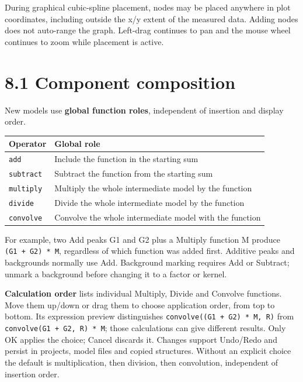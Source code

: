 \documentclass[
  10pt,
  a4paper,
  oneside]{scrreprt}
\begin{document}
During graphical cubic-spline placement, nodes may be placed anywhere in
plot coordinates, including outside the x/y extent of the measured data.
Adding nodes does not auto-range the graph. Left-drag continues to pan
and the mouse wheel continues to zoom while placement is active.

\hypertarget{component-composition}{%
\section{8.1 Component composition}\label{component-composition}}

New models use \textbf{global function roles}, independent of insertion
and display order.

\begin{longtable}[]{@{}ll@{}}
\toprule
Operator & Global role\tabularnewline
\midrule
\endhead
\texttt{add} & Include the function in the starting sum\tabularnewline
\texttt{subtract} & Subtract the function from the starting
sum\tabularnewline
\texttt{multiply} & Multiply the whole intermediate model by the
function\tabularnewline
\texttt{divide} & Divide the whole intermediate model by the
function\tabularnewline
\texttt{convolve} & Convolve the whole intermediate model with the
function\tabularnewline
\bottomrule
\end{longtable}

For example, two Add peaks G1 and G2 plus a Multiply function M produce
\texttt{(G1\ +\ G2)\ *\ M}, regardless of which function was added
first. Additive peaks and backgrounds normally use Add. Background
marking requires Add or Subtract; unmark a background before changing it
to a factor or kernel.

\textbf{Calculation order} lists individual Multiply, Divide and
Convolve functions. Move them up/down or drag them to choose application
order, from top to bottom. Its expression preview distinguishes
\texttt{convolve((G1\ +\ G2)\ *\ M,\ R)} from
\texttt{convolve(G1\ +\ G2,\ R)\ *\ M}; those calculations can give
different results. Only OK applies the choice; Cancel discards it.
Changes support Undo/Redo and persist in projects, model files and
copied structures. Without an explicit choice the default is
multiplication, then division, then convolution, independent of
insertion order.
\end{document}
